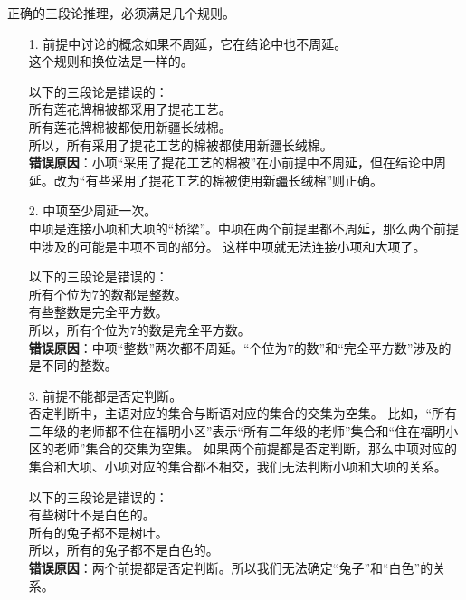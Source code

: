 \documentclass[12pt,UTF8]{ctexbook}
\begin{document}
正确的三段论推理，必须满足几个规则。
\begin{enumerate}
    \item[1.] 前提中讨论的概念如果不周延，它在结论中也不周延。\\
    这个规则和换位法是一样的。
    \begin{ex*}
        以下的三段论是错误的： \\
        \indent 所有莲花牌棉被都采用了提花工艺。\\
        \indent 所有莲花牌棉被都使用新疆长绒棉。\\
        \indent 所以，所有采用了提花工艺的棉被都使用新疆长绒棉。\\
        \textbf{错误原因}：小项“采用了提花工艺的棉被”在小前提中不周延，但在结论中周延。改为“有些采用了提花工艺的棉被使用新疆长绒棉”则正确。
    \end{ex*}
    \item[2.] 中项至少周延一次。\\
    中项是连接小项和大项的“桥梁”。中项在两个前提里都不周延，那么两个前提中涉及的可能是中项不同的部分。
    这样中项就无法连接小项和大项了。 
    \begin{ex*}
        以下的三段论是错误的： \\
        \indent 所有个位为$7$的数都是整数。\\
        \indent 有些整数是完全平方数。\\
        \indent 所以，所有个位为$7$的数是完全平方数。\\
        \textbf{错误原因}：中项“整数”两次都不周延。“个位为$7$的数”和“完全平方数”涉及的是不同的整数。
    \end{ex*}    
    \item[3.] 前提不能都是否定判断。\\
    否定判断中，主语对应的集合与断语对应的集合的交集为空集。
    比如，“所有二年级的老师都不住在福明小区”表示“所有二年级的老师”集合和“住在福明小区的老师”集合的交集为空集。
    如果两个前提都是否定判断，那么中项对应的集合和大项、小项对应的集合都不相交，我们无法判断小项和大项的关系。
    \begin{ex*}
        以下的三段论是错误的： \\
        \indent 有些树叶不是白色的。\\
        \indent 所有的兔子都不是树叶。\\
        \indent 所以，所有的兔子都不是白色的。\\
        \textbf{错误原因}：两个前提都是否定判断。所以我们无法确定“兔子”和“白色”的关系。
    \end{ex*} 

\end{enumerate}
\end{document}
